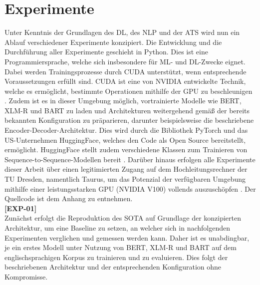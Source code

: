 \chapter{Experimente}
\thispagestyle{fancy}
\label{chap:Experimente}

\noindent
Unter Kenntnis der Grundlagen des \ac{DL}, des \ac{NLP} und der \ac{ATS} wird nun ein Ablauf verschiedener Experimente konzipiert. Die Entwicklung und die Durchführung aller Experimente geschieht in Python. Dies ist eine Programmiersprache, welche sich insbesondere für \ac{ML}- und \ac{DL}-Zwecke eignet. Dabei werden Trainingsprozesse durch \ac{CUDA} unterstützt, wenn entsprechende Voraussetzungen erfüllt sind. \ac{CUDA} ist eine von NVIDIA entwickelte Technik, welche es ermöglicht, bestimmte Operationen mithilfe der GPU zu beschleunigen \cite{NVI21}. Zudem ist es in dieser Umgebung möglich, vortrainierte Modelle wie \ac{BERT}, {XLM-R} und \ac{BART} zu laden und Architekturen weitergehend gemäß der bereits bekannten Konfiguration zu präparieren, darunter beispielsweise die beschriebene Encoder-Decoder-Architektur. Dies wird durch die Bibliothek PyTorch und das US-Unternehmen HuggingFace, welches den Code als Open Source bereitstellt, ermöglicht. HuggingFace stellt zudem verschiedene Klassen zum Trainieren von Sequence-to-Sequence-Modellen bereit \cite{HUG21}. Darüber hinaus erfolgen alle Experimente dieser Arbeit über einen legitimierten Zugang auf dem Hochleitungsrechner der TU Dresden, namentlich Taurus, um das Potenzial der verfügbaren Umgebung mithilfe einer leistungsstarken GPU (NVIDIA V100) vollends auszuschöpfen \cite{ZIH21}. Der Quellcode ist dem Anhang zu entnehmen.\\

\noindent
\textbf{[EXP-01]}\\
\noindent
Zunächst erfolgt die Reproduktion des \ac{SOTA} auf Grundlage der konzipierten Architektur, um eine Baseline zu setzen, an welcher sich in nachfolgenden Experimenten verglichen und gemessen werden kann. Daher ist es unabdingbar, je ein erstes Modell unter Nutzung von \ac{BERT}, {XLM-R} und \ac{BART} auf dem englischsprachigen Korpus zu trainieren und zu evaluieren. Dies folgt der beschriebenen Architektur und der entsprechenden Konfiguration ohne Kompromisse.
\newpage

